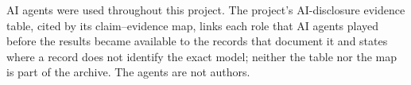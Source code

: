 
AI agents were used throughout this project. The project's AI-disclosure evidence table, cited by its claim--evidence map, links each role that AI agents played before the results became available to the records that document it and states where a record does not identify the exact model; neither the table nor the map is part of the archive. The agents are not authors. %

